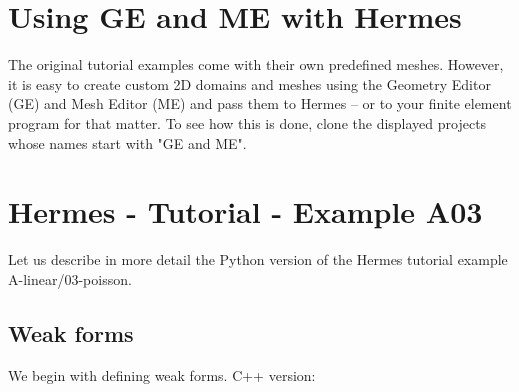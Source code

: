 \documentclass{article}
\begin{document}
\section*{Using GE and ME with Hermes}

The original tutorial examples come with their own predefined meshes. 
However, it is easy to create custom 2D domains and meshes using the Geometry Editor (GE)
and Mesh Editor (ME) and pass them to Hermes -- or to your finite element 
program for that matter. To see how this is done, 
clone the displayed projects whose names start with "GE and ME". 

\section*{Hermes - Tutorial - Example A03}

Let us describe in more detail the Python version 
of the Hermes tutorial example A-linear/03-poisson. 

\subsection*{Weak forms}

We begin with defining weak forms. C++ version:
\end{document}
